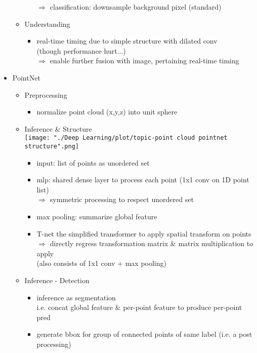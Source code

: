 \begin{itemize}
\begin{itemize}
\begin{itemize}
		$\Rightarrow$ classification: downsample background pixel (standard)
		\end{itemize}
	\item Understanding
		\begin{itemize}
		\item real-time timing due to simple structure with dilated conv \\
		(though performance hurt...) \\
		$\Rightarrow$ enable further fusion with image, pertaining real-time timing
		\end{itemize}
	\end{itemize}
\item PointNet
	\begin{itemize}
	\item Preprocessing
		\begin{itemize}
		\item normalize point cloud (x,y,z) into unit sphere
		\end{itemize}
	\item Inference \& Structure \\
	\texttt{[image: "./Deep Learning/plot/topic-point cloud pointnet structure".png]}
		\begin{itemize}
		\item input: list of points as unordered set
		\item mlp: shared dense layer to process each point (1x1 conv on 1D point list) \\
		$\Rightarrow$ symmetric processing to respect unordered set
		\item max pooling: summarize global feature
		\item T-net the simplified transformer to apply spatial transform on points \\
		$\Rightarrow$ directly regress transformation matrix \& matrix multiplication to apply \\
		(also consists of 1x1 conv + max pooling)
		\end{itemize}
	\item Inference - Detection
		\begin{itemize}
		\item inference as segmentation \\ 
		i.e. concat global feature \& per-point feature to produce per-point pred
		\item generate bbox for group of connected points of same label (i.e. a post processing)
		\end{itemize}

\end{itemize}
\end{itemize}
